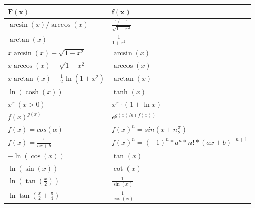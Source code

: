 \documentclass[8pt]{extarticle}
\begin{document}
\begin{multicols*}{3}
\begin{center}
\begin{tabularx}{\linewidth}{c>{\centering\arraybackslash}Xc}
    \end{tabularx}
  \end{center}

  
\begin{center}
  \begin{tabularx}{\linewidth}{>{\centering\arraybackslash}X>{\centering\arraybackslash}X}
  
  $\mathbf{F(x)}$ & $\mathbf{f(x)}$ \\
  \midrule
  $\arcsin(x) / \arccos(x)$ & $\frac{1 / -1}{\sqrt{1 - x^2}}$ \\
  $\arctan(x)$ & $\frac{1}{1 + x^2}$ \\ 

  $x\arcsin(x) + \sqrt{1 - x^2}$ & $\arcsin(x)$\\
  $x\arccos(x) - \sqrt{1 - x^2}$ & $\arccos(x)$\\
  $x\arctan(x) - \frac{1}{2}\ln(1+x^2)$ & $\arctan(x)$\\
  $\ln(\cosh(x))$ & $\tanh(x)$\\

   
  $x^x \ (x > 0)$ & $x^x \cdot (1 + \ln{x})$ \\
$f(x)^{g(x)}$ & $e^{g(x) ln(f(x))}$\\
$f(x) = cos(\alpha)$ & $f(x)^n = sin(x + n\frac{\pi}{2})$\\
$f(x) = \frac{1}{ax + b}$ & $f(x)^n = (-1)^n * a^n * n! * (ax + b)^{-n+1}$\\
  $-\ln(\cos(x))$ & $\tan(x)$\\
  $\ln(\sin(x))$ & $\cot(x)$\\
  $\ln(\tan(\frac{x}{2}))$ & $\frac{1}{\sin(x)}$\\
  $\ln{\tan(\frac{x}{2} + \frac{\pi}{4})}$ & $\frac{1}{\cos(x)}$\\

  \bottomrule
  \end{tabularx}
\end{center}


\end{multicols*}
\end{document}
